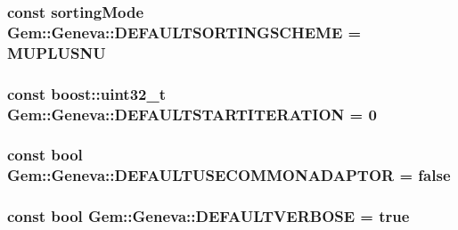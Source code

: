 \label{db/de9/namespaceGem_1_1Geneva_abffd76330c5d5bbb1808dd71a3241944}
\hypertarget{namespaceGem_1_1Geneva_ae75bab36ebf398bfef62bc0432280980}{
\subsubsection[{DEFAULTSORTINGSCHEME}]{\setlength{\rightskip}{0pt plus 5cm}const sortingMode {\bf Gem::Geneva::DEFAULTSORTINGSCHEME} = MUPLUSNU}}
\label{db/de9/namespaceGem_1_1Geneva_ae75bab36ebf398bfef62bc0432280980}
\hypertarget{namespaceGem_1_1Geneva_a1295783da2a3d26bd95ee66a2b1e0e28}{
\subsubsection[{DEFAULTSTARTITERATION}]{\setlength{\rightskip}{0pt plus 5cm}const boost::uint32\_\-t {\bf Gem::Geneva::DEFAULTSTARTITERATION} = 0}}
\label{db/de9/namespaceGem_1_1Geneva_a1295783da2a3d26bd95ee66a2b1e0e28}
\hypertarget{namespaceGem_1_1Geneva_ae66444afbff6f0454a6f7087d0b9ee0a}{
\subsubsection[{DEFAULTUSECOMMONADAPTOR}]{\setlength{\rightskip}{0pt plus 5cm}const bool {\bf Gem::Geneva::DEFAULTUSECOMMONADAPTOR} = false}}
\label{db/de9/namespaceGem_1_1Geneva_ae66444afbff6f0454a6f7087d0b9ee0a}
\hypertarget{namespaceGem_1_1Geneva_acfa46336c5707f08a2ef1e87fde2ba4d}{
\subsubsection[{DEFAULTVERBOSE}]{\setlength{\rightskip}{0pt plus 5cm}const bool {\bf Gem::Geneva::DEFAULTVERBOSE} = true}}
\label{db/de9/namespaceGem_1_1Geneva_acfa46336c5707f08a2ef1e87fde2ba4d}
